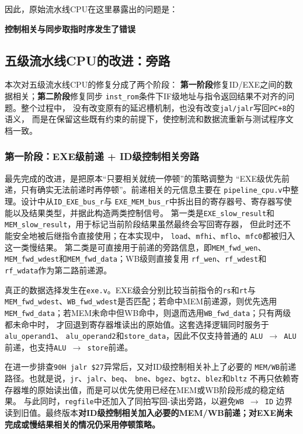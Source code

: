 ﻿\documentclass{article}
\begin{document}
因此，原始流水线CPU在这里暴露出的问题是：
\begin{center}
\textbf{控制相关与同步取指时序发生了错误}
\end{center}

\subsection{五级流水线CPU的改进：旁路}
本次对五级流水线CPU的修复分成了两个阶段：
\textbf{第一阶段}修复ID/EXE之间的数据相关；\textbf{第二阶段}修复同步
\texttt{inst\_rom}条件下IF级地址与指令返回结果不对齐的问题。整个过程中，
没有改变原有的延迟槽机制，也没有改变\texttt{jal/jalr}写回\texttt{PC+8}的语义，
而是在保留这些既有约束的前提下，使控制流和数据流重新与测试程序文档一致。

\subsubsection{第一阶段：EXE级前递 + ID级控制相关旁路}

最先完成的改进，是把原本“只要相关就统一停顿”的策略调整为
“EXE级优先前递，只有确实无法前递时再停顿”。前递相关的元信息主要在
\texttt{pipeline\_cpu.v}中整理。设计中从\texttt{ID\_EXE\_bus\_r}与
\texttt{EXE\_MEM\_bus\_r}中拆出目的寄存器号、寄存器写使能以及结果类型，并据此构造两类控制信号。
第一类是\texttt{EXE\_slow\_result}和\texttt{MEM\_slow\_result}，用于标记当前阶段结果虽然最终会写回寄存器，
但此时还不能安全地被后继指令直接使用；在本实现中，
\texttt{load}、\texttt{mfhi}、\texttt{mflo}、\texttt{mfc0}都被归入这一类慢结果。
第二类是可直接用于前递的旁路信息，即\texttt{MEM\_fwd\_wen}、
\texttt{MEM\_fwd\_wdest}和\texttt{MEM\_fwd\_data}；WB级则直接复用
\texttt{rf\_wen}、\texttt{rf\_wdest}和\texttt{rf\_wdata}作为第二路前递源。

真正的数据选择发生在\texttt{exe.v}。EXE级会分别比较当前指令的\texttt{rs}和\texttt{rt}与
\texttt{MEM\_fwd\_wdest}、\texttt{WB\_fwd\_wdest}是否匹配；若命中MEM前递源，则优先选用
\texttt{MEM\_fwd\_data}；若MEM未命中但WB命中，则退而选用\texttt{WB\_fwd\_data}；只有两级都未命中时，
才回退到寄存器堆读出的原始值。这套选择逻辑同时服务于\texttt{alu\_operand1}、
\texttt{alu\_operand2}和\texttt{store\_data}，因此不仅支持普通的
\texttt{ALU $\rightarrow$ ALU}前递，也支持\texttt{ALU $\rightarrow$ store}前递。

在进一步排查\texttt{90H jalr \$27}异常后，又对ID级控制相关补上了必要的
\texttt{MEM/WB}前递路径。也就是说，\texttt{jr}、\texttt{jalr}、\texttt{beq}、
\texttt{bne}、\texttt{bgez}、\texttt{bgtz}、\texttt{blez}和\texttt{bltz}
不再只依赖寄存器堆的原始读出值，而是可以优先使用已经在MEM或WB阶段形成的稳定结果。
与此同时，\texttt{regfile}中还加入了同拍写回-读出旁路，以避免\texttt{WB $\rightarrow$ ID}
边界读到旧值。最终版本\textbf{对ID级控制相关加入必要的MEM/WB前递；对EXE尚未完成或慢结果相关的情况仍采用停顿策略。}
\end{document}
